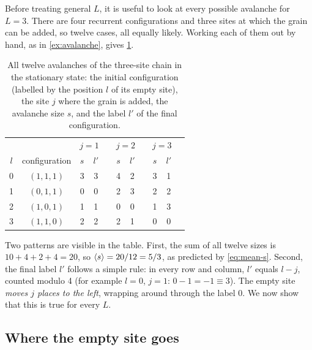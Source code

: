 Before treating general $L$, it is useful to look at every possible avalanche for $L=3$. There are four recurrent
configurations and three sites at which the grain can be added, so twelve cases, all equally likely.
Working each of them out by hand, as in \cref{ex:avalanche}, gives \cref{tab:L3}.

\begin{table}[t]
\centering
\caption{All twelve avalanches of the three-site chain in the stationary state: the initial configuration (labelled by the
position $l$ of its empty site), the site $j$ where the grain is added, the avalanche size $s$, and the label $l'$ of the
final configuration.}
\label{tab:L3}
\begin{tabular}{cc@{\qquad}ccc@{\qquad}ccc@{\qquad}ccc}
\toprule
& & \multicolumn{2}{c}{$j=1$} & & \multicolumn{2}{c}{$j=2$} & & \multicolumn{2}{c}{$j=3$} \\
$l$ & configuration & $s$ & $l'$ & & $s$ & $l'$ & & $s$ & $l'$ \\
\midrule
0 & $(1,1,1)$ & 3 & 3 & & 4 & 2 & & 3 & 1 \\
1 & $(0,1,1)$ & 0 & 0 & & 2 & 3 & & 2 & 2 \\
2 & $(1,0,1)$ & 1 & 1 & & 0 & 0 & & 1 & 3 \\
3 & $(1,1,0)$ & 2 & 2 & & 2 & 1 & & 0 & 0 \\
\bottomrule
\end{tabular}
\end{table}

Two patterns are visible in the table. First, the sum of all twelve sizes is $10+4+2+4 = 20$, so $\left\langle s \right\rangle= 20/12 = 5/3$, as
predicted by \cref{eq:mean-s}. Second, the final label $l'$ follows a simple rule: in every row and column, $l'$ equals
$l-j$, counted modulo 4 (for example $l=0$, $j=1$: $0-1 = -1\equiv 3$). The empty site \emph{moves $j$ places to the left},
wrapping around through the label 0. We now show that this is true for every $L$.

\subsection{Where the empty site goes}

